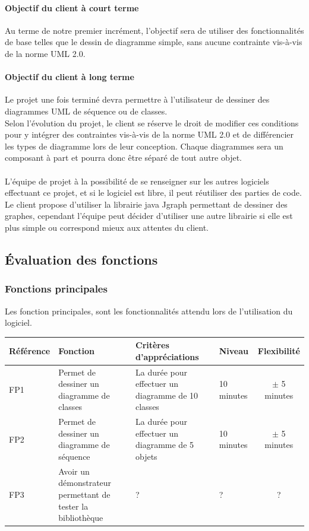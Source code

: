 \documentclass[12pt,a4paper,openany]{article}
\begin{document}
	\paragraph{Objectif du client à court terme} Au terme de notre premier incrément, l'objectif sera
	de utiliser des fonctionnalités de base telles que le dessin de diagramme simple, sans aucune
	contrainte vis-à-vis de la norme UML 2.0.
	\paragraph{Objectif du client à long terme}
	Le projet une fois terminé devra permettre à l'utilisateur de dessiner des diagrammes UML de séquence ou de classes.\\
	Selon l'évolution du projet, le client se réserve le droit de modifier ces conditions pour y
	intégrer des contraintes vis-à-vis de la norme UML 2.0 et de différencier les types de diagramme lors de leur conception. 
	Chaque diagrammes sera un composant à part et pourra donc être séparé de tout autre objet.
	\paragraph{} L'équipe de projet à la possibilité de se renseigner sur les autres logiciels effectuant
	ce projet, et si le logiciel est libre, il peut réutiliser des parties de code. \\
	Le client propose d'utiliser la librairie java Jgraph permettant de dessiner des graphes, cependant l'équipe peut décider
	d'utiliser une autre librairie si elle est plus simple ou correspond mieux aux attentes du client.
	\subsection{Évaluation des fonctions}
	\subsubsection{Fonctions principales}
	Les fonction principales, sont les fonctionnalités attendu lors de l'utilisation du logiciel.\\ 
	\begin{tabular}{|p{2cm}|p{3cm}|p{5cm}|p{3cm}|c|}
		\hline
		\textbf{Référence}& \textbf{Fonction} & \textbf{Critères d'appréciations} & \textbf{Niveau} & \textbf{Flexibilité} \\
		\hline
			FP1 & Permet de dessiner un diagramme de classes & La durée pour effectuer un diagramme de 10 classes & 10 minutes & $\pm$ 5 minutes\\
		\hline
			FP2 & Permet de dessiner un diagramme de séquence & La durée pour effectuer un diagramme de 5 objets & 10 minutes & $\pm$ 5 minutes\\
		\hline
			FP3 & Avoir un démonstrateur permettant de tester la bibliothèque & ? & ? & ? \\
		\hline
	\end{tabular}
\end{document}
